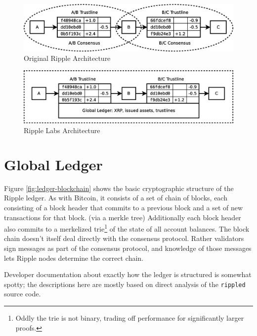 \documentclass{article}
\begin{document}
\begin{figure}
    \centering
    \includegraphics[scale=0.3]{figures/orig-ripple.eps}
    \caption{Original Ripple Architecture}
    \label{fig:orig-ripple}
\end{figure}

\begin{figure}
    \centering
    \includegraphics[scale=0.3]{figures/ripple-labs-ripple.eps}
    \caption{Ripple Labs Architecture}
    \label{fig:ripple-labs-ripple}
\end{figure}


\section{Global Ledger}

Figure \ref{fig:ledger-blockchain} shows the basic cryptographic structure of
the Ripple ledger. As with Bitcoin, it consists of a set of chain of blocks,
each consisting of a block header that commits to a previous block and a set of
new transactions for that block. (via a merkle tree) Additionally each block
header also commits to a merkelized trie\footnote{Oddly the trie is not binary,
trading off performance for significantly larger proofs.} of the state of all
account balances. The block chain doesn't itself deal directly with the
consensus protocol. Rather validators sign messages as part of the consensus
protocol, and knowledge of those messages lets Ripple nodes determine the
correct chain.

Developer documentation about exactly how the ledger is structured is somewhat
spotty; the descriptions here are mostly based on direct analysis of the
\texttt{rippled} source code.
\end{document}
